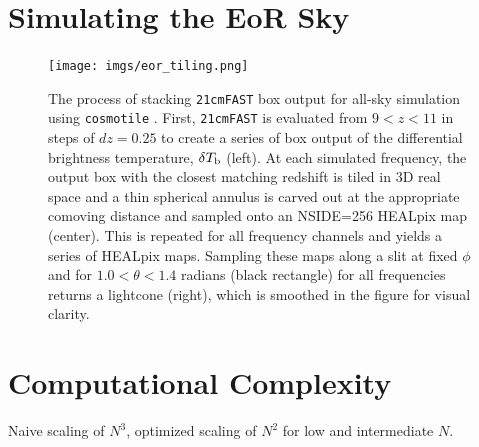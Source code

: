 \documentclass[a4paper,fleqn,usenatbib]{mnras}
\begin{document}

\appendix

\section{Simulating the EoR Sky}
\label{sec:sim_app}

\begin{figure}
\centering
\label{fig:eor_tile}
\texttt{[image: imgs/eor\_tiling.png]}
\caption{The process of stacking \texttt{21cmFAST} box output for all-sky simulation using \texttt{cosmotile} \citep{Kittisiwit2018}. First, \texttt{21cmFAST} is evaluated from $9<z<11$ in steps of $dz=0.25$ to create a series of box output of the differential brightness temperature, $\delta T_{\rm b}$ (left). At each simulated frequency, the output box with the closest matching redshift is tiled in 3D real space and a thin spherical annulus is carved out at the appropriate comoving distance and sampled onto an NSIDE=256 HEALpix map (center). This is repeated for all frequency channels and yields a series of HEALpix maps. Sampling these maps along a slit at fixed $\phi$ and for $1.0 < \theta < 1.4$ radians (black rectangle) for all frequencies returns a lightcone (right), which is smoothed in the figure for visual clarity.}
\end{figure}



\section{Computational Complexity}
Naive scaling of $N^3$, optimized scaling of $N^2$ for low and intermediate $N$.






\bsp	%
\label{lastpage}
\end{document}
